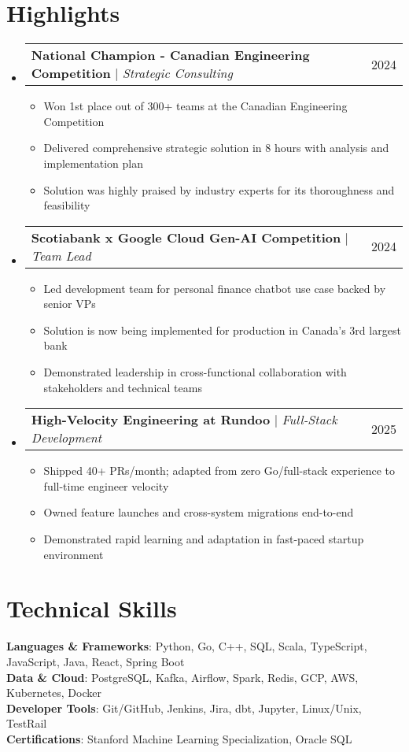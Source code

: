 \documentclass[letterpaper,11pt]{article}
\makeatletter
\newcommand{\resumeItem}[1]{
  \item\small{
    {#1 \vspace{-2pt}}
  }
}
\newcommand{\resumeProjectHeading}[2]{
    \item
    \begin{tabular*}{0.97\textwidth}{l@{\extracolsep{\fill}}r}
      \small#1 & #2 \\
    \end{tabular*}\vspace{-7pt}
}
\newcommand{\resumeSubHeadingListStart}{\begin{itemize}[leftmargin=0.15in, label={}]}
\newcommand{\resumeSubHeadingListEnd}{\end{itemize}}
\newcommand{\resumeItemListStart}{\begin{itemize}}
\newcommand{\resumeItemListEnd}{\end{itemize}\vspace{-5pt}}
\makeatother
\begin{document}
\section{Highlights}
    \resumeSubHeadingListStart
      \resumeProjectHeading
          {\textbf{National Champion - Canadian Engineering Competition} $|$ \emph{Strategic Consulting}}{2024}
          \resumeItemListStart
            \resumeItem{Won 1st place out of 300+ teams at the Canadian Engineering Competition}
            \resumeItem{Delivered comprehensive strategic solution in 8 hours with analysis and implementation plan}
            \resumeItem{Solution was highly praised by industry experts for its thoroughness and feasibility}
          \resumeItemListEnd
      \resumeProjectHeading
          {\textbf{Scotiabank x Google Cloud Gen-AI Competition} $|$ \emph{Team Lead}}{2024}
          \resumeItemListStart
            \resumeItem{Led development team for personal finance chatbot use case backed by senior VPs}
            \resumeItem{Solution is now being implemented for production in Canada's 3rd largest bank}
            \resumeItem{Demonstrated leadership in cross-functional collaboration with stakeholders and technical teams}
          \resumeItemListEnd
      \resumeProjectHeading
          {\textbf{High-Velocity Engineering at Rundoo} $|$ \emph{Full-Stack Development}}{2025}
          \resumeItemListStart
            \resumeItem{Shipped 40+ PRs/month; adapted from zero Go/full-stack experience to full-time engineer velocity}
            \resumeItem{Owned feature launches and cross-system migrations end-to-end}
            \resumeItem{Demonstrated rapid learning and adaptation in fast-paced startup environment}
          \resumeItemListEnd
    \resumeSubHeadingListEnd



%
\section{Technical Skills}
 \begin{itemize}[leftmargin=0.15in, label={}]
    \small{\item{
     \textbf{Languages \& Frameworks}{: Python, Go, C++, SQL, Scala, TypeScript, JavaScript, Java, React, Spring Boot} \\
     \textbf{Data \& Cloud}{: PostgreSQL, Kafka, Airflow, Spark, Redis, GCP, AWS, Kubernetes, Docker} \\
     \textbf{Developer Tools}{: Git/GitHub, Jenkins, Jira, dbt, Jupyter, Linux/Unix, TestRail} \\
     \textbf{Certifications}{: Stanford Machine Learning Specialization, Oracle SQL}
    }}
 \end{itemize}


\end{document}
